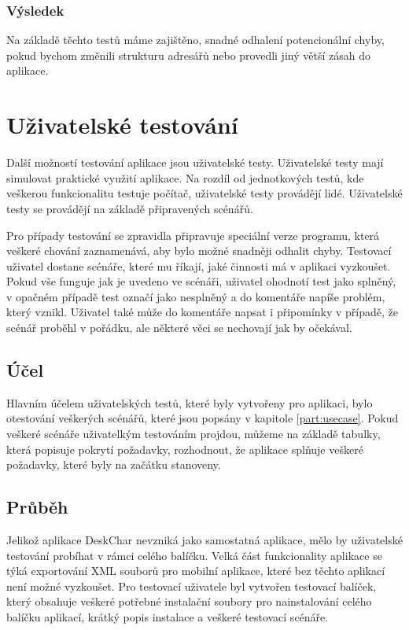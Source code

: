 \documentclass[thesis=B,czech]{resources/FITthesis}[2012/06/26]
\begin{document}
			\subsubsection*{Výsledek}
Na základě těchto testů máme zajištěno, snadné odhalení potencionální chyby, pokud bychom změnili strukturu adresářů nebo provedli jiný větší zásah do aplikace.

\section{Uživatelské testování}
Další možností testování aplikace jsou uživatelské testy. Uživatelské testy mají simulovat praktické využití aplikace. Na rozdíl od jednotkových testů, kde veškerou funkcionalitu testuje počítač, uživatelské testy provádějí lidé. Uživatelské testy se provádějí na základě připravených scénářů. \par

Pro případy testování se zpravidla připravuje speciální verze programu, která veškeré chování zaznamenává, aby bylo možné snadněji odhalit chyby. Testovací uživatel dostane scénáře, které mu říkají, jaké činnosti má v aplikaci vyzkoušet. Pokud vše funguje jak je uvedeno ve scénáři, uživatel ohodnotí test jako splněný, v opačném případě test označí jako nesplněný a do komentáře napíše problém, který vznikl. Uživatel také může do komentáře napsat i připomínky v případě, že scénář proběhl v pořádku, ale některé věci se nechovají jak by očekával. 

\subsection{Účel}
Hlavním účelem uživatelských testů, které byly vytvořeny pro aplikaci, bylo otestování veškerých scénářů, které jsou popsány v kapitole \ref{part:usecase}. Pokud veškeré scénáře uživatelkým testováním projdou, můžeme na základě tabulky, která popisuje pokrytí požadavky, rozhodnout, že aplikace splňuje veškeré požadavky, které byly na začátku stanoveny. 

\subsection{Průběh}
Jelikož aplikace DeskChar nevzniká jako samostatná aplikace, mělo by uživatelské testování probíhat v rámci celého balíčku. Velká část funkcionality aplikace se týká exportování XML souborů pro mobilní aplikace, které bez těchto aplikací není možné vyzkoušet. Pro testovací uživatele byl vytvořen testovací balíček, který obsahuje veškeré potřebné instalační soubory pro nainstalování celého balíčku aplikací, krátký popis instalace a veškeré testovací scénáře. \par
\end{document}
